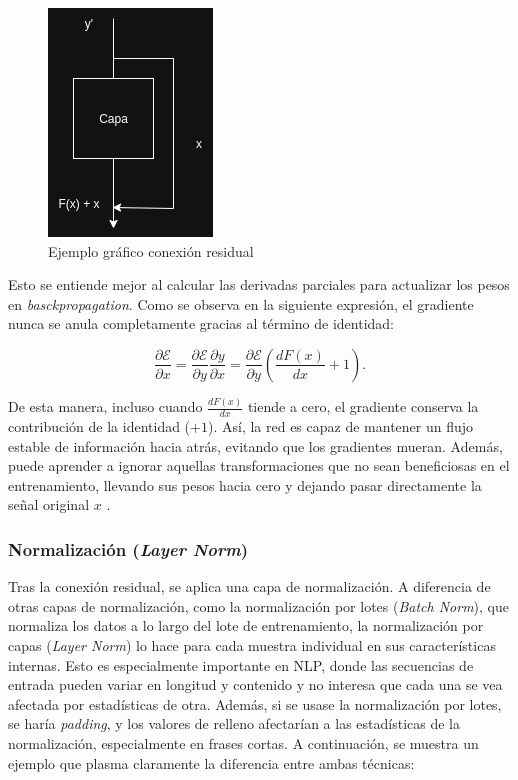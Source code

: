 \documentclass[11pt]{book}
\theoremstyle{plain}
\theoremstyle{definition}
\begin{document}
\begin{figure}[h]
    \centering
    \includegraphics[width=0.5\linewidth]{img/ResNet.png}
    \caption{Ejemplo gráfico conexión residual}
    \label{fig:placeholder13}
\end{figure}

Esto se entiende mejor al calcular las derivadas parciales para actualizar los pesos en \textit{basckpropagation}. Como se observa en la siguiente expresión, el gradiente nunca se anula completamente gracias al término de identidad: 

\[
\frac{\partial \mathcal{E}}{\partial x}
= \frac{\partial \mathcal{E}}{\partial y}
    \frac{\partial y}{\partial x}
= \frac{\partial \mathcal{E}}{\partial y}
    \left( \frac{dF(x)}{dx} + 1 \right).
\]

De esta manera, incluso cuando $\frac{dF(x)}{dx}$ tiende a cero, el gradiente conserva la contribución de la identidad ($+1$). Así, la red es capaz de mantener un flujo estable de información hacia atrás, evitando que los gradientes mueran. Además, puede aprender a ignorar aquellas transformaciones que no sean beneficiosas en el entrenamiento, llevando sus pesos hacia cero y dejando pasar directamente la señal original $x$ \parencite{apxml_addnorm}. 

\subsubsection{Normalización (\textit{Layer Norm})}

Tras la conexión residual, se aplica una capa de normalización. A diferencia de otras capas de normalización, como la normalización por lotes (\textit{Batch Norm}), que normaliza los datos a lo largo del lote de entrenamiento, la normalización por capas (\textit{Layer Norm}) lo hace para cada muestra individual en sus características internas. Esto es especialmente importante en NLP, donde las secuencias de entrada pueden variar en longitud y contenido y no interesa que cada una se vea afectada por estadísticas de otra. Además, si se usase la normalización por lotes, se haría \textit{padding}, y los valores de relleno afectarían a las estadísticas de la normalización, especialmente en frases cortas. A continuación, se muestra un ejemplo que plasma claramente la diferencia entre ambas técnicas:
\end{document}
